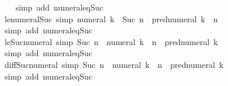 \begin{isabellebody}
%
\isadelimproof
\ \ %
\endisadelimproof
%
\isatagproof
{}\isamarkupfalse%
\ {\isacharparenleft}{\kern0pt}simp\ add{\isacharcolon}{\kern0pt}\ numeral{\isacharunderscore}{\kern0pt}eq{\isacharunderscore}{\kern0pt}Suc{\isacharparenright}{\kern0pt}%
\endisatagproof
{\isafoldproof}%
%
\isadelimproof
\isanewline
%
\endisadelimproof
\isanewline
{}\isamarkupfalse%
\ le{\isacharunderscore}{\kern0pt}numeral{\isacharunderscore}{\kern0pt}Suc\ {\isacharbrackleft}{\kern0pt}simp{\isacharbrackright}{\kern0pt}{\isacharcolon}{\kern0pt}\ {\isachardoublequoteopen}numeral\ k\ {\isasymle}\ Suc\ n\ {\isasymlongleftrightarrow}\ pred{\isacharunderscore}{\kern0pt}numeral\ k\ {\isasymle}\ n{\isachardoublequoteclose}\isanewline
%
\isadelimproof
\ \ %
\endisadelimproof
%
\isatagproof
{}\isamarkupfalse%
\ {\isacharparenleft}{\kern0pt}simp\ add{\isacharcolon}{\kern0pt}\ numeral{\isacharunderscore}{\kern0pt}eq{\isacharunderscore}{\kern0pt}Suc{\isacharparenright}{\kern0pt}%
\endisatagproof
{\isafoldproof}%
%
\isadelimproof
\isanewline
%
\endisadelimproof
\isanewline
{}\isamarkupfalse%
\ le{\isacharunderscore}{\kern0pt}Suc{\isacharunderscore}{\kern0pt}numeral\ {\isacharbrackleft}{\kern0pt}simp{\isacharbrackright}{\kern0pt}{\isacharcolon}{\kern0pt}\ {\isachardoublequoteopen}Suc\ n\ {\isasymle}\ numeral\ k\ {\isasymlongleftrightarrow}\ n\ {\isasymle}\ pred{\isacharunderscore}{\kern0pt}numeral\ k{\isachardoublequoteclose}\isanewline
%
\isadelimproof
\ \ %
\endisadelimproof
%
\isatagproof
{}\isamarkupfalse%
\ {\isacharparenleft}{\kern0pt}simp\ add{\isacharcolon}{\kern0pt}\ numeral{\isacharunderscore}{\kern0pt}eq{\isacharunderscore}{\kern0pt}Suc{\isacharparenright}{\kern0pt}%
\endisatagproof
{\isafoldproof}%
%
\isadelimproof
\isanewline
%
\endisadelimproof
\isanewline
{}\isamarkupfalse%
\ diff{\isacharunderscore}{\kern0pt}Suc{\isacharunderscore}{\kern0pt}numeral\ {\isacharbrackleft}{\kern0pt}simp{\isacharbrackright}{\kern0pt}{\isacharcolon}{\kern0pt}\ {\isachardoublequoteopen}Suc\ n\ {\isacharminus}{\kern0pt}\ numeral\ k\ {\isacharequal}{\kern0pt}\ n\ {\isacharminus}{\kern0pt}\ pred{\isacharunderscore}{\kern0pt}numeral\ k{\isachardoublequoteclose}\isanewline
%
\isadelimproof
\ \ %
\endisadelimproof
%
\isatagproof
{}\isamarkupfalse%
\ {\isacharparenleft}{\kern0pt}simp\ add{\isacharcolon}{\kern0pt}\ numeral{\isacharunderscore}{\kern0pt}eq{\isacharunderscore}{\kern0pt}Suc{\isacharparenright}{\kern0pt}%
\endisatagproof
{\isafoldproof}%
%
\isadelimproof
\isanewline
%
\endisadelimproof
\isanewline
{}\isamarkupfalse%

\end{isabellebody}
